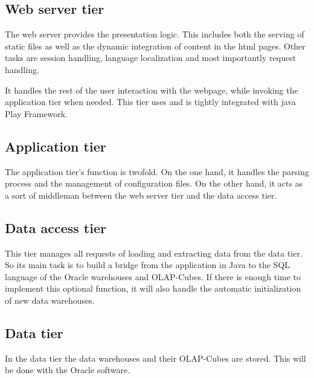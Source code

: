 \subsection{Web server tier}
The web server provides the presentation logic. This includes both the serving of static files as well as
the dynamic integration of content in the html pages.
Other tasks are session handling, language localization and most importantly request handling.

It handles the rest of the user interaction with the webpage, while invoking the application tier when needed.
This tier uses and is tightly integrated with java Play Framework.


\subsection{Application tier}
The application tier's function is twofold.
On the one hand, it handles the parsing process and the management of configuration files.
On the other hand, it acts as a sort of middleman between the web server tier and the data access tier.

\subsection{Data access tier}
This tier manages all requests of loading and extracting data from the data tier. So its main task is
to build a bridge from the application in Java to the SQL language of the Oracle warehouses and OLAP-Cubes.
If there is enough time to implement this optional function, it will also handle 
the automatic initialization of new data warehouses.  

\subsection{Data tier}
In the data tier the data warehouses and their OLAP-Cubes are stored. 
This will be done with the Oracle software.  
